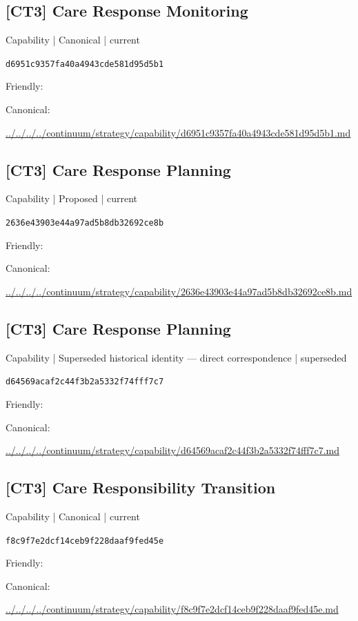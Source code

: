 \documentclass[10pt,a4paper]{article}
\begin{document}
\subsection*{[CT3] Care Response Monitoring}
{\small Capability | Canonical | current}\par
\texttt{d6951c9357fa40a4943cde581d95d5b1}\par
Friendly: \par
Canonical: \par
{\footnotesize\url{../../../../continuum/strategy/capability/d6951c9357fa40a4943cde581d95d5b1.md}}\par
\subsection*{[CT3] Care Response Planning}
{\small Capability | Proposed | current}\par
\texttt{2636e43903e44a97ad5b8db32692ce8b}\par
Friendly: \par
Canonical: \par
{\footnotesize\url{../../../../continuum/strategy/capability/2636e43903e44a97ad5b8db32692ce8b.md}}\par
\subsection*{[CT3] Care Response Planning}
{\small Capability | Superseded historical identity — direct correspondence | superseded}\par
\texttt{d64569acaf2c44f3b2a5332f74fff7c7}\par
Friendly: \par
Canonical: \par
{\footnotesize\url{../../../../continuum/strategy/capability/d64569acaf2c44f3b2a5332f74fff7c7.md}}\par
\subsection*{[CT3] Care Responsibility Transition}
{\small Capability | Canonical | current}\par
\texttt{f8c9f7e2dcf14ceb9f228daaf9fed45e}\par
Friendly: \par
Canonical: \par
{\footnotesize\url{../../../../continuum/strategy/capability/f8c9f7e2dcf14ceb9f228daaf9fed45e.md}}\par
\end{document}
